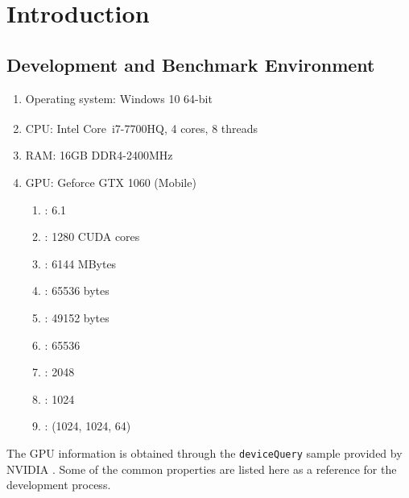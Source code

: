 \documentclass[12pt, a4paper]{article}
\begin{document}
\renewcommand{\baselinestretch}{1.3}\normalsize
\tableofcontents
\renewcommand{\baselinestretch}{1.0}\normalsize
\newpage

\section{Introduction}

\subsection{Development and Benchmark Environment} \label{subsec:development_environment}
\begin{enumerate}
  \item Operating system: Windows 10 64-bit
  \item CPU: Intel\textsuperscript{\textregistered} Core\texttrademark\ i7-7700HQ, 4 cores, 8
  threads
  \item RAM: 16GB DDR4-2400MHz
  \item GPU: Geforce GTX 1060 (Mobile)
    \begin{enumerate}[label=\alph*.]
      \item {} : 6.1
      \item {} : 1280 CUDA cores
      \item {} : 6144 MBytes
      \item {} : 65536 bytes
      \item {} : 49152 bytes
      \item {} : 65536
      \item {} : 2048
      \item {} : 1024
      \item {} : (1024, 1024, 64)
    \end{enumerate}
\end{enumerate}

The GPU information is obtained through the \texttt{deviceQuery} sample provided by NVIDIA
\cite{deviceQuery}. Some of the common properties are listed here as a reference for the development
process.
\end{document}
